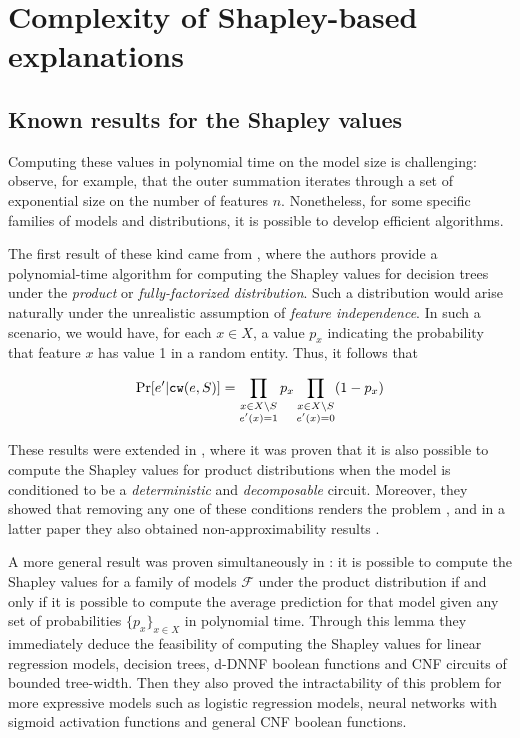 \section{Complexity of Shapley-based explanations}

\subsection{Known results for the Shapley values}

Computing these values in polynomial time on the model size is challenging: observe, for example, that the outer summation iterates through a set of exponential size on the number of features $n$. Nonetheless, for some specific families of models and distributions, it is possible to develop efficient algorithms.

The first result of these kind came from \cite{lundberg2020local}, where the authors provide a polynomial-time algorithm for computing the Shapley values for decision trees under the \textit{product} or \textit{fully-factorized distribution}. Such a distribution would arise naturally under the unrealistic assumption of \textit{feature independence}. In such a scenario, we would have, for each $x \in X$, a value $p_x$ indicating the probability that feature $x$ has value 1 in a random entity. Thus, it follows that

\begin{align*}
    \Pr[e' | \texttt{cw}(e, S)] = \prod_{\substack{x \in X \setminus S \\ e'(x) = 1}} p_x \prod_{\substack{x \in X \setminus S \\ e'(x) = 0}} (1-p_x) 
\end{align*}

These results were extended in \cite{arenas2021tractability}, where it was proven that it is also possible to compute the Shapley values for product distributions when the model is conditioned to be a \textit{deterministic} and \textit{decomposable} circuit. Moreover, they showed that removing any one of these conditions renders the problem \sharpPhard, and in a latter paper they also obtained non-approximability results \cite{arenas2023complexity}.

A more general result was proven simultaneously in \cite{van2022tractability}: it is possible to compute the Shapley values for a family of models $\mathcal{F}$ under the product distribution if and only if it is possible to compute the average prediction for that model given any set of probabilities $\{p_x\}_{x \in X}$ in polynomial time. Through this lemma they immediately deduce the feasibility of computing the Shapley values for linear regression models, decision trees, d-DNNF boolean functions and CNF circuits of bounded tree-width. Then they also proved the intractability of this problem for more expressive models such as logistic regression models, neural networks with sigmoid activation functions and general CNF boolean functions.

